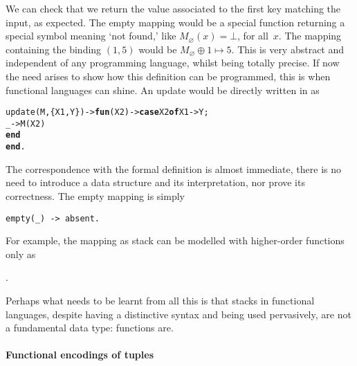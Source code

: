 We can check that we return the value associated to the first key
matching the input, as expected. The empty mapping would be a special
function returning a special symbol meaning `not found,' like
\(M_\varnothing(x) = \bot\), for all~\(x\). The mapping containing the
binding \((1,5)\) would be \(M_\varnothing \mathrel{\oplus} 1 \mapsto
5\). This is very abstract and independent of any programming
language, whilst being totally precise. If now the need arises to show
how this definition can be programmed, this is when functional
languages can shine. An update would be directly written in \Erlang as
\begin{alltt}
update(M,\{X1,Y\}) -> \textbf{fun}(X2) -> \textbf{case} X2 \textbf{of} X1 -> Y;
                                           \_ -> M(X2)
                               \textbf{end}
                    \textbf{end}.
\end{alltt}
The correspondence with the formal definition is almost immediate,
there is no need to introduce a data structure and its interpretation,
nor prove its correctness. The empty mapping is simply
\begin{verbatim}
empty(_) -> absent.
\end{verbatim}
For example, the mapping as stack \erlcode{[\{a,0\},\{b,1\},\{a,5\}]}
can be modelled with higher\hyp{}order functions only as
\begin{center}
.
\end{center}
Perhaps what needs to be learnt from all this is that stacks in
functional languages, despite having a distinctive syntax and being
used pervasively, are not a fundamental data type: functions are.

\paragraph{Functional encodings of tuples}

